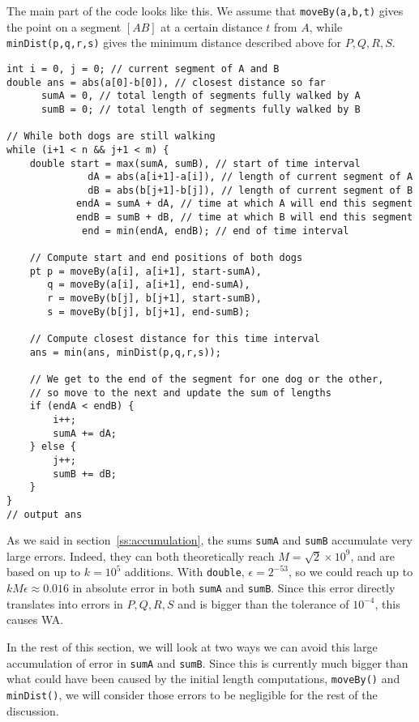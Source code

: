 The main part of the code looks like this. We assume that \lstinline|moveBy(a,b,t)| gives the point on a segment $[AB]$ at a certain distance $t$ from $A$, while \lstinline|minDist(p,q,r,s)| gives the minimum distance described above for $P,Q,R,S$.
\begin{lstlisting}
int i = 0, j = 0; // current segment of A and B
double ans = abs(a[0]-b[0]), // closest distance so far
      sumA = 0, // total length of segments fully walked by A
      sumB = 0; // total length of segments fully walked by B

// While both dogs are still walking
while (i+1 < n && j+1 < m) {
    double start = max(sumA, sumB), // start of time interval
              dA = abs(a[i+1]-a[i]), // length of current segment of A
              dB = abs(b[j+1]-b[j]), // length of current segment of B
            endA = sumA + dA, // time at which A will end this segment
            endB = sumB + dB, // time at which B will end this segment
             end = min(endA, endB); // end of time interval
    
    // Compute start and end positions of both dogs
    pt p = moveBy(a[i], a[i+1], start-sumA),
       q = moveBy(a[i], a[i+1], end-sumA),
       r = moveBy(b[j], b[j+1], start-sumB),
       s = moveBy(b[j], b[j+1], end-sumB);
    
    // Compute closest distance for this time interval
    ans = min(ans, minDist(p,q,r,s));
    
    // We get to the end of the segment for one dog or the other,
    // so move to the next and update the sum of lengths
    if (endA < endB) {
        i++;
        sumA += dA;
    } else {
        j++;
        sumB += dB;
    }
}
// output ans
\end{lstlisting}

As we said in section~\ref{ss:accumulation}, the sums \lstinline|sumA| and \lstinline|sumB| accumulate very large errors. Indeed, they can both theoretically reach $M=\sqrt{2}\times 10^9$, and are based on up to $k=10^5$ additions. With \lstinline|double|, $\epsilon = 2^{-53}$, so we could reach up to $kM\epsilon \approx 0.016$ in absolute error in both \lstinline|sumA| and \lstinline|sumB|. Since this error directly translates into errors in $P,Q,R,S$ and is bigger than the tolerance of $10^{-4}$, this causes WA.

In the rest of this section, we will look at two ways we can avoid this large accumulation of error in \lstinline|sumA| and \lstinline|sumB|. Since this is currently much bigger than what could have been caused by the initial length computations, \lstinline|moveBy()| and \lstinline|minDist()|, we will consider those errors to be negligible for the rest of the discussion.

